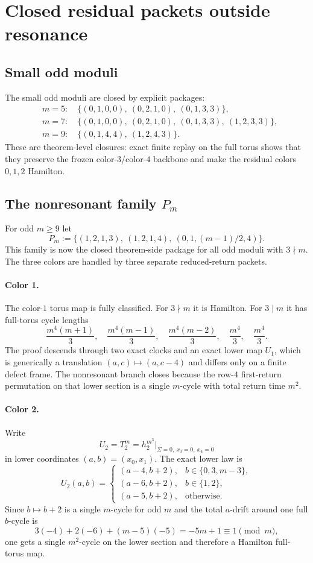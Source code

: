 \documentclass[11pt]{article}
\newcommand{\Pm}{P_m}
\begin{document}
\section{Closed residual packets outside resonance}

\subsection{Small odd moduli}

The small odd moduli are closed by explicit packages:
\[
\begin{aligned}
&m=5:\quad \{(0,1,0,0),\ (0,2,1,0),\ (0,1,3,3)\},\\
&m=7:\quad \{(0,1,0,0),\ (0,2,1,0),\ (0,1,3,3),\ (1,2,3,3)\},\\
&m=9:\quad \{(0,1,4,4),\ (1,2,4,3)\}.
\end{aligned}
\]
These are theorem-level closures: exact finite replay on the full torus shows
that they preserve the frozen color-$3$/color-$4$ backbone and make the
residual colors $0,1,2$ Hamilton.

\subsection{The nonresonant family \texorpdfstring{$\Pm$}{Pm}}

For odd $m\ge 9$ let
\[
\Pm:=\{(1,2,1,3),\ (1,2,1,4),\ (0,1,(m-1)/2,4)\}.
\]
This family is now the closed theorem-side package for all odd moduli with
$3\nmid m$.
The three colors are handled by three separate reduced-return packets.

\paragraph{Color 1.}
The color-$1$ torus map is fully classified.
For $3\nmid m$ it is Hamilton.
For $3\mid m$ it has full-torus cycle lengths
\[
\frac{m^4(m+1)}3,\quad \frac{m^4(m-1)}3,\quad \frac{m^4(m-2)}3,
\quad \frac{m^4}3,\quad \frac{m^4}3.
\]
The proof descends through two exact clocks and an exact lower map
\(U_1\), which is generically a translation
\((a,c)\mapsto(a,c-4)\) and differs only on a finite defect frame.
The nonresonant branch closes because the row-$4$ first-return permutation on
that lower section is a single $m$-cycle with total return time $m^2$.

\paragraph{Color 2.}
Write
\[
U_2=T_2^m=h_2^{m^3}\big|_{\Sigma=0,\ x_3=0,\ x_4=0}
\]
in lower coordinates $(a,b)=(x_0,x_1)$.
The exact lower law is
\[
U_2(a,b)=
\begin{cases}
(a-4,b+2), & b\in\{0,3,m-3\},\\
(a-6,b+2), & b\in\{1,2\},\\
(a-5,b+2), & \text{otherwise.}
\end{cases}
\]
Since $b\mapsto b+2$ is a single $m$-cycle for odd $m$ and the total $a$-drift
around one full $b$-cycle is
\[
3(-4)+2(-6)+(m-5)(-5)=-5m+1\equiv 1\pmod m,
\]
one gets a single $m^2$-cycle on the lower section and therefore a Hamilton
full-torus map.
\end{document}
